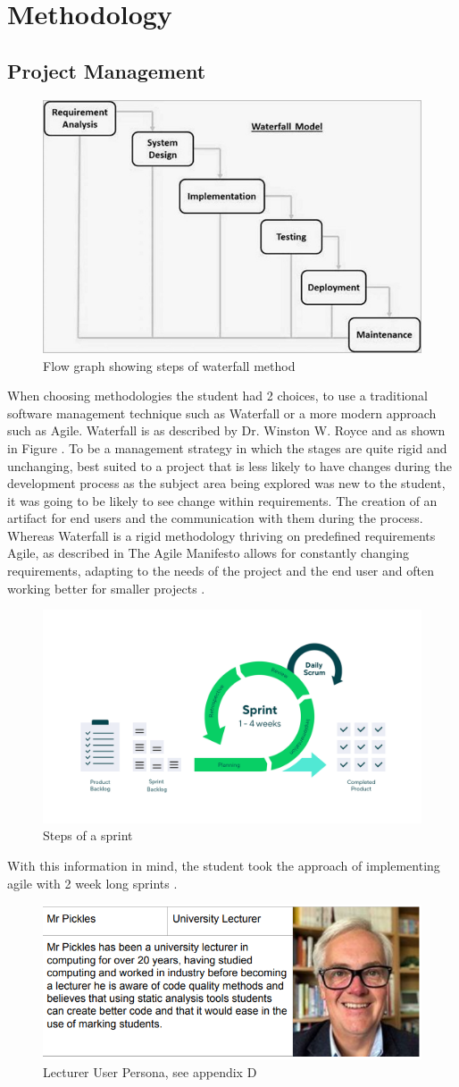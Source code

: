 \section{Methodology}
\subsection{\textbf{Project Management}}
\begin{figure}
    \includegraphics[width=.3\textwidth]{images/sdlc_waterfall_model.jpg}
    \caption{Flow graph showing steps of waterfall method \cite{waterfallimage}}
    \label{fig:waterfall}
\end{figure}
When choosing methodologies the student had 2 choices, to use a traditional software management technique such as Waterfall or a more modern approach such as Agile.
Waterfall is as described by Dr. Winston W. Royce \cite{waterfall} and as shown in Figure .
To be a management strategy in which the stages are quite rigid and unchanging, best suited to a project that is less likely to have changes during the development process
as the subject area being explored was new to the student, it was going to be likely to see change within requirements. The creation of
an artifact for end users and the communication with them during the process.
Whereas Waterfall is a rigid methodology thriving on predefined requirements Agile, as described in The Agile Manifesto
\cite{agile} allows for constantly changing requirements, adapting to the needs of the project and the end user and often working better
for smaller projects \cite{waterfallvsagile}.
\begin{figure}
    \includegraphics[width=.4\textwidth]{images/scrum-cycle-resized.png}
    \caption{Steps of a sprint \cite{sprints}}
    \label{fig:sprints}
\end{figure}
With this information in mind, the student took the approach of implementing agile with 2 week long sprints .
\begin{figure}
    \includegraphics[width=.3\textwidth]{images/user-personas.png}
    \caption{Lecturer User Persona, see appendix D}
    \label{fig:userpersona}
\end{figure}
